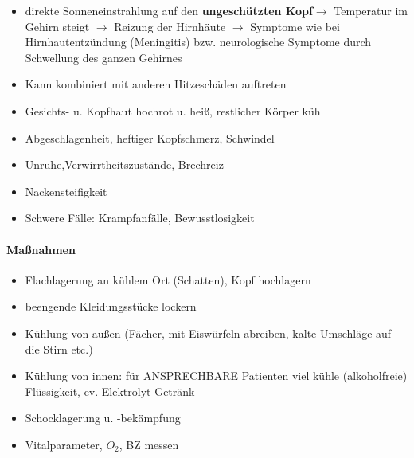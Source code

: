 {\begin{itemize}
\item {\mdseries
direkte  Sonneneinstrahlung auf den \textbf{ungesch\"utzten 
Kopf}${\rightarrow}$ Temperatur  im Gehirn  steigt  ${\rightarrow}$
Reizung der Hirnhäute  ${\rightarrow}$ Symptome wie bei 
Hirnhautentz\"undung (Meningitis) bzw.  neurologische Symptome durch 
Schwellung des ganzen Gehirnes}
\item {\mdseries
Kann kombiniert mit anderen Hitzeschäden auftreten}
\item {\mdseries
Gesichts- u. Kopfhaut hochrot u. hei{\ss}, restlicher Körper k\"uhl}
\item {\mdseries
Abgeschlagenheit, heftiger Kopfschmerz, Schwindel}
\item {\mdseries
Unruhe,Verwirrtheitszustände, Brechreiz}
\item {\mdseries
Nackensteifigkeit}
\item {\mdseries
Schwere Fälle: Krampfanfälle, Bewusstlosigkeit}
\end{itemize}}




\begin{gMassnahmenEnv}
\paragraph{Ma{\ss}nahmen}

\begin{itemize}
    \item Flachlagerung an k\"uhlem Ort (Schatten), Kopf hochlagern
    \item beengende Kleidungsst\"ucke lockern
    \item K\"uhlung von au{\ss}en (Fächer, mit Eisw\"urfeln abreiben, kalte
    Umschläge auf die Stirn etc.)
    \item K\"uhlung von innen: f\"ur ANSPRECHBARE Patienten viel k\"uhle
    (alkoholfreie) Fl\"ussigkeit, ev. Elektrolyt-Getränk
    \item Schocklagerung u. -bekämpfung
    \item Vitalparameter, $O_2$, BZ messen
\end{itemize}
\end{gMassnahmenEnv}



